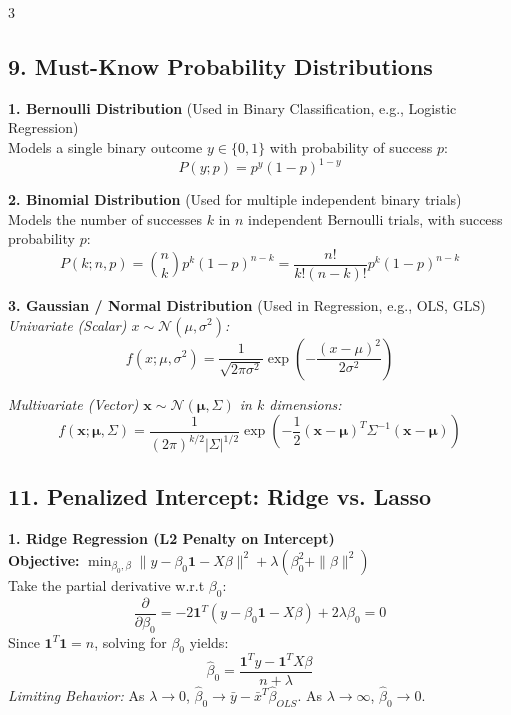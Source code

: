 \documentclass[10pt,landscape]{article}
\begin{document}
\begin{multicols*}{3}
\subsection*{9. Must-Know Probability Distributions}

\textbf{1. Bernoulli Distribution} (Used in Binary Classification, e.g., Logistic Regression)\\
Models a single binary outcome $y \in \{0, 1\}$ with probability of success $p$:
$$ P(y; p) = p^y (1 - p)^{1-y} $$

\textbf{2. Binomial Distribution} (Used for multiple independent binary trials)\\
Models the number of successes $k$ in $n$ independent Bernoulli trials, with success probability $p$:
$$ P(k; n, p) = \binom{n}{k} p^k (1 - p)^{n-k} = \frac{n!}{k!(n-k)!} p^k (1 - p)^{n-k} $$

\textbf{3. Gaussian / Normal Distribution} (Used in Regression, e.g., OLS, GLS)\\
\textit{Univariate (Scalar) $x \sim \mathcal{N}(\mu, \sigma^2)$:}
$$ f(x; \mu, \sigma^2) = \frac{1}{\sqrt{2\pi\sigma^2}} \exp\left(-\frac{(x - \mu)^2}{2\sigma^2}\right) $$

\textit{Multivariate (Vector) $\mathbf{x} \sim \mathcal{N}(\boldsymbol{\mu}, \Sigma)$ in $k$ dimensions:}
$$ f(\mathbf{x}; \boldsymbol{\mu}, \Sigma) = \frac{1}{(2\pi)^{k/2} |\Sigma|^{1/2}} \exp\left(-\frac{1}{2}(\mathbf{x} - \boldsymbol{\mu})^T \Sigma^{-1} (\mathbf{x} - \boldsymbol{\mu})\right) $$


\subsection*{11. Penalized Intercept: Ridge vs. Lasso}

\textbf{1. Ridge Regression (L2 Penalty on Intercept)} \\
\textbf{Objective:} $\min_{\beta_0, \beta} \|y - \beta_0 \mathbf{1} - X\beta\|^2 + \lambda(\beta_0^2 + \|\beta\|^2)$ \\
Take the partial derivative w.r.t $\beta_0$:
$$ \frac{\partial}{\partial \beta_0} = -2\mathbf{1}^T(y - \beta_0 \mathbf{1} - X\beta) + 2\lambda\beta_0 = 0 $$
Since $\mathbf{1}^T \mathbf{1} = n$, solving for $\beta_0$ yields:
$$ \hat{\beta}_0 = \frac{\mathbf{1}^T y - \mathbf{1}^T X \beta}{n + \lambda} $$
\textit{Limiting Behavior:} As $\lambda \to 0$, $\hat{\beta}_0 \to \bar{y} - \bar{x}^T\hat{\beta}_{OLS}$. As $\lambda \to \infty$, $\hat{\beta}_0 \to 0$.


\end{multicols*}
\end{document}
